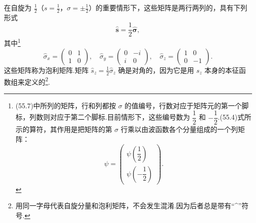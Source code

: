 在自旋为 $\frac{1}{2}$（$s=\frac{1}{2}$，$\sigma=\pm\frac{1}{2}$）的重要情形下，这些矩阵是两行两列的，具有下列形式
\begin{equation}
  \hat{\boldsymbol{s}}=\frac{1}{2}\hat{\boldsymbol{\sigma}},
\end{equation}
其中\footnote{(55.7)中所列的矩阵，行和列都按 $\sigma$ 的值编号，行数对应于矩阵元的第一个脚标，列数则对应于第二个脚标.目前情形下，这些编号数为 $\dfrac{1}{2}$ 和 $-\dfrac{1}{2}$.(55.4)式所示的算符，其作用是把矩阵的第 $\sigma$ 行乘以由波函数各个分量组成的一个列矩阵：
\begin{equation*}
  \psi=\left(\begin{array}{c}
  \psi\left(\dfrac{1}{2}\right)\\[1.2em]
  \psi\left(-\dfrac{1}{2}\right)
  \end{array}\right).
\end{equation*}}
\begin{equation}
  \hat{\sigma}_x=\left(\begin{array}{cc}0&1\\1&0\end{array}\right),\quad
  \hat{\sigma}_y=\left(\begin{array}{cc}0&-i\\i&0\end{array}\right),\quad
  \hat{\sigma}_z=\left(\begin{array}{cc}1&0\\0&-1\end{array}\right).
\end{equation}
这些矩阵称为泡利矩阵.矩阵 $\hat{s}_z=\frac{1}{2}\hat{\sigma}_z$ 确是对角的，因为它是用 $s_z$ 本身的本征函数组来定义的\footnote{用同一字母代表自旋分量和泡利矩阵，不会发生混淆.因为后者总是带有“\textasciicircum{}”符号.}.

